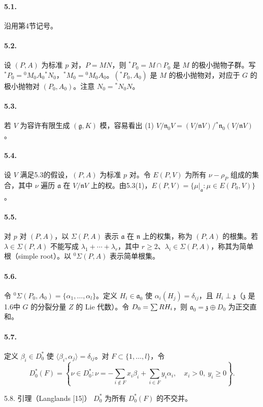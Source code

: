 \paragraph*{5.1.} 沿用第4节记号。
\paragraph*{5.2.} 设 $(P,A)$ 为标准 $p$ 对，$P=MN$，则 ${}^*P_0=M\cap P_0$ 是 $M$ 的极小抛物子群。写 ${}^*P_0={}^0M_0A_0{}^*N_0$，${}^*M_0={}^0M_0A_0$。$( {}^*P_0,A_0)$ 是 $M$ 的极小抛物对，对应于 $G$ 的极小抛物对 $(P_0,A_0)$。注意 $N_0={}^*N_0N$。
\paragraph*{5.3.} 若 $V$ 为容许有限生成 $(\mathfrak g,K)$ 模，容易看出 (1) $V/\mathfrak n_0V=(V/\mathfrak nV)/{}^*\mathfrak n_0(V/\mathfrak nV)$。
\paragraph*{5.4.} 设 $V$ 满足5.3的假设，$(P,A)$ 为标准 $p$ 对。令 $E(P,V)$ 为所有 $\nu-\rho_P$ 组成的集合，其中 $\nu$ 遍历 $\mathfrak a$ 在 $V/\mathfrak nV$ 上的权。由5.3(1)，$E(P,V)=\{\mu|_{\mathfrak a}:\mu\in E(P_0,V)\}$。
\paragraph*{5.5.} 对 $p$ 对 $(P,A)$，以 $\Sigma(P,A)$ 表示 $\mathfrak a$ 在 $\mathfrak n$ 上的权集，称为 $(P,A)$ 的根集。若 $\lambda\in\Sigma(P,A)$ 不能写成 $\lambda_1+\cdots+\lambda_r$，其中 $r\ge2$、$\lambda_i\in\Sigma(P,A)$，称其为简单根（simple root）。以 ${}^0\Sigma(P,A)$ 表示简单根集。
\paragraph*{5.6.} 令 ${}^0\Sigma(P_0,A_0)=\{\alpha_1,\ldots,\alpha_l\}$。定义 $H_i\in\mathfrak a_0$ 使 $\alpha_i(H_j)=\delta_{ij}$，且 $H_i\perp\mathfrak z$（$\mathfrak z$ 是1.6中 $G$ 的分裂分量 $Z$ 的 Lie 代数）。令 $D_0=\sum R H_i$，则 $\mathfrak a_0=\mathfrak z\oplus D_0$ 为正交直和。
\paragraph*{5.7.} 定义 $\beta_i\in D_0^*$ 使 $\langle\beta_i,\alpha_j\rangle=\delta_{ij}$。对 $F\subset\{1,\ldots,l\}$，令
\[
 D_0^*(F)=\left\{\nu\in D_0^*:\nu=-\sum_{i\notin F}x_i\beta_i+
 \sum_{i\in F}y_i\alpha_i,\quad x_i>0,\ y_i\ge0\right\}.
\]
\begin{originaltheorem}{5.8. 引理（Langlands [15]）}
$D_0^*$ 为所有 $D_0^*(F)$ 的不交并。
\end{originaltheorem}

